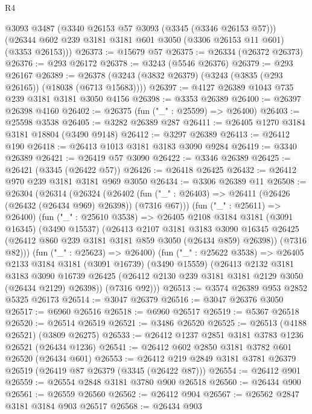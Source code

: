 \begin{lexlean}{R4}
\begin{coremodule}
      @3093
      @3487
      (@3340 @26153 @57 @3093 (@3345 (@3346 @26153 @57)))
      (@26344 @602 @239 @3181 @3181 @601 @3050 (@3306 @26153 @11 @601) (@3353 @26153)))
@26373 := @15679 @57
@26375 := @26334 (@26372 @26373)
@26376 := @293 @26172
@26378 := @3243 (@5546 @26376)
@26379 := @293 @26167
@26389 := @26378 (@3243 (@3832 @26379) (@3243 (@3835 (@293 @26165)) (@18038 (@6713 @15683))))
@26397 := @4127 @26389 @1043 @735 @239 @3181 @3181 @3050 @4156
@26398 := @3353 @26389
@26400 := @26397 @26398 @4160
@26402 := @26375 (fun ("_" : @25599) => @26400)
@26403 := @25598 @3538
@26405 := @3282 @26389 @287
@26411 := @26405 @1270 @3184 @3181 @18804 (@3490 @9148)
@26412 := @3297 @26389
@26413 := @26412 @190
@26418 := @26413 @1013 @3181 @3183 @3090 @9284
@26419 := @3340 @26389
@26421 := @26419 @57 @3090
@26422 := @3346 @26389
@26425 := @26421 (@3345 (@26422 @57))
@26426 := @26418 @26425
@26432 := @26412 @970 @239 @3181 @3181 @969 @3050
@26434 := @3306 @26389 @11
@26508 := @26304
    (@26314
      (@26324
        (@26402 (fun ("_" : @26403) => @26411 (@26426 (@26432 (@26434 @969) @26398)) (@7316 @67)))
        (fun ("_" : @25611) => @26400)
        (fun ("_" : @25610 @3538) =>
        @26405
          @2108
          @3184
          @3181
          (@3091 @16345)
          (@3490 @15537)
          (@26413
            @2107
            @3181
            @3183
            @3090
            @16345
            @26425
            (@26412 @860 @239 @3181 @3181 @859 @3050 (@26434 @859) @26398))
          (@7316 @82)))
      (fun ("_" : @25623) => @26400)
      (fun ("_" : @25622 @3538) =>
      @26405
        @2133
        @3184
        @3181
        (@3091 @16739)
        (@3490 @15559)
        (@26413
          @2132
          @3181
          @3183
          @3090
          @16739
          @26425
          (@26412 @2130 @239 @3181 @3181 @2129 @3050 (@26434 @2129) @26398))
        (@7316 @92)))
@26513 := @3574 @26389 @953 @2852 @5325 @26173
@26514 := @3047 @26379
@26516 := @3047 @26376 @3050
@26517 := @6960 @26516
@26518 := @6960 @26517
@26519 := @5367 @26518
@26520 := @26514 @26519
@26521 := @3486 @26520
@26525 := @26513 (@4188 @26521) (@3809 @26275)
@26533 := @26412 @1237 @2851 @3181 @3783 @1236 @26521 (@26434 @1236)
@26541 := @26412 @602 @2850 @3181 @3782 @601 @26520 (@26434 @601)
@26553 := @26412 @219 @2849 @3181 @3781 @26379 @26519 (@26419 @87 @26379 (@3345 (@26422 @87)))
@26554 := @26412 @901
@26559 := @26554 @2848 @3181 @3780 @900 @26518
@26560 := @26434 @900
@26561 := @26559 @26560
@26562 := @26412 @904
@26567 := @26562 @2847 @3181 @3184 @903 @26517
@26568 := @26434 @903

\end{coremodule}
\end{lexlean}
